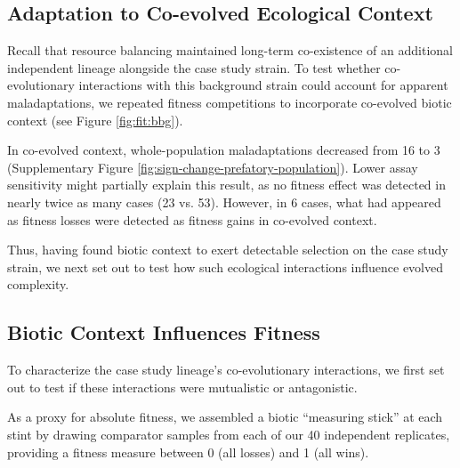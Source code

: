 \subsection{Adaptation to Co-evolved Ecological Context}

Recall that resource balancing maintained long-term co-existence of an additional independent lineage alongside the case study strain.
To test whether co-evolutionary interactions with this background strain could account for apparent maladaptations, we repeated fitness competitions to incorporate co-evolved biotic context (see Figure \ref{fig:fit:bbg}).

In co-evolved context, whole-population maladaptations decreased from 16 to 3 (Supplementary Figure \ref{fig:sign-change-prefatory-population}).
Lower assay sensitivity might partially explain this result, as no fitness effect was detected in nearly twice as many cases (23 vs. 53).
However, in 6 cases, what had appeared as fitness losses were detected as fitness gains in co-evolved context.

Thus, having found biotic context to exert detectable selection on the case study strain, we next set out to test how such ecological interactions influence evolved complexity.

\subsection{Biotic Context Influences Fitness}



To characterize the case study lineage's co-evolutionary interactions, we first set out to test if these interactions were mutualistic or antagonistic.

As a proxy for absolute fitness, we assembled a biotic ``measuring stick'' at each stint by drawing comparator samples from each of our 40 independent replicates, providing a fitness measure between 0 (all losses) and 1 (all wins).

